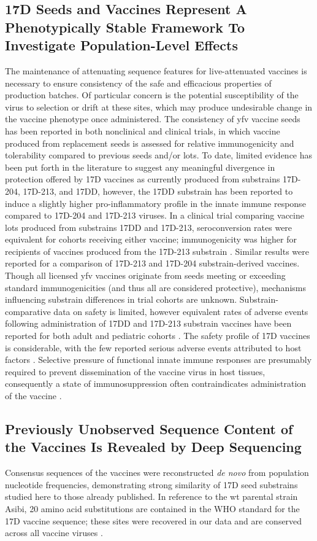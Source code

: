 	\subsection{17D Seeds and Vaccines Represent A Phenotypically Stable Framework To Investigate Population-Level Effects}
The maintenance of attenuating sequence features for live-attenuated vaccines is necessary to ensure consistency of the safe and efficacious properties of production batches. Of particular concern is the potential susceptibility of the virus to selection or drift at these sites, which may produce undesirable change in the vaccine phenotype once administered. The consistency of \gls{yfv} vaccine seeds has been reported in both nonclinical and clinical trials, in which vaccine produced from replacement seeds is assessed for relative immunogenicity and tolerability compared to previous seeds and/or lots. To date, limited evidence has been put forth in the literature to suggest any meaningful divergence in protection offered by 17D vaccines as currently produced from substrains 17D-204, 17D-213, and 17DD, however, the 17DD substrain has been reported to induce a slightly higher pro-inflammatory profile in the innate immune response compared to 17D-204 and 17D-213 viruses. In a clinical trial comparing vaccine lots produced from substrains 17DD and 17D-213, seroconversion rates were equivalent for cohorts receiving either vaccine; immunogenicity was higher for recipients of vaccines produced from the 17D-213 substrain \parencite{Camacho:2004ui}. Similar results were reported for a comparison of 17D-213 and 17D-204 substrain-derived vaccines. Though all licensed \gls{yfv} vaccines originate from seeds meeting or exceeding standard immunogenicities (and thus all are considered protective), mechanisms influencing substrain differences in trial cohorts are unknown. Substrain-comparative data on safety is limited, however equivalent rates of adverse events following administration of 17DD and 17D-213 substrain vaccines have been reported for both adult and pediatric cohorts \parencite{Camacho:2005vb,Ripoll:2014fz}. The safety profile of 17D vaccines is considerable, with the few reported serious adverse events attributed to host factors \parencite{Silva:2010jp}. Selective pressure of functional innate immune responses are presumably required to prevent dissemination of the vaccine virus in host tissues, consequently a state of immunosuppression often contraindicates administration of the vaccine \parencite{Erickson:2013kv}.
	\subsection{Previously Unobserved Sequence Content of the Vaccines Is Revealed by Deep Sequencing}
Consensus sequences of the vaccines were reconstructed \emph{de novo} from population nucleotide frequencies, demonstrating strong similarity of 17D seed substrains studied here to those already published. In reference to the \gls{wt} parental strain Asibi, 20 amino acid substitutions are contained in the WHO standard for the 17D vaccine sequence; these sites were recovered in our data and are conserved across all vaccine viruses \parencite{WorldHealthOrganization:2010wo}. 

